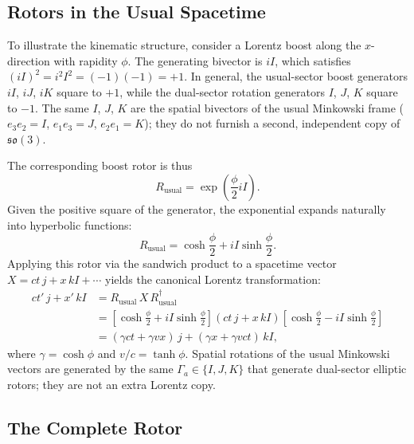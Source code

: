 \documentclass[a4paper]{article}
\begin{document}
\subsection{Rotors in the Usual Spacetime}

To illustrate the kinematic structure, consider a Lorentz boost along the $x$-direction with rapidity $\phi$. The generating bivector is $iI$, which satisfies $(iI)^2 = i^2 I^2 = (-1)(-1) = +1$. In general, the usual-sector boost generators $iI$, $iJ$, $iK$ square to $+1$, while the dual-sector rotation generators $I$, $J$, $K$ square to $-1$. The same $I$, $J$, $K$ are the spatial bivectors of the usual Minkowski frame ($e_3e_2=I$, $e_1e_3=J$, $e_2e_1=K$); they do not furnish a second, independent copy of $\mathfrak{so}(3)$.

The corresponding boost rotor is thus
\[
R_\text{usual} = \exp\!\left( \frac{\phi}{2} iI \right).
\]
Given the positive square of the generator, the exponential expands naturally into hyperbolic functions:
\[
R_\text{usual} = \cosh \frac{\phi}{2} + iI \sinh \frac{\phi}{2}.
\]
Applying this rotor via the sandwich product to a spacetime vector $X = ct \, j + x \, kI + \cdots$ yields the canonical Lorentz transformation:
\begin{align*}
ct' \, j + x' \, kI &= R_\text{usual} \, X \, R_\text{usual}^\dagger \\
&= \left[ \cosh\frac{\phi}{2} + iI \sinh\frac{\phi}{2} \right] (ct \, j + x \, kI) \left[ \cosh\frac{\phi}{2} - iI \sinh\frac{\phi}{2} \right] \\
&= (\gamma ct + \gamma v x) \, j + (\gamma x + \gamma v ct) \, kI,
\end{align*}
where $\gamma = \cosh \phi$ and $v/c = \tanh \phi$. Spatial rotations of the usual Minkowski vectors are generated by the same $\Gamma_a\in\{I,J,K\}$ that generate dual-sector elliptic rotors; they are not an extra Lorentz copy.

\subsection{The Complete Rotor}
\end{document}
